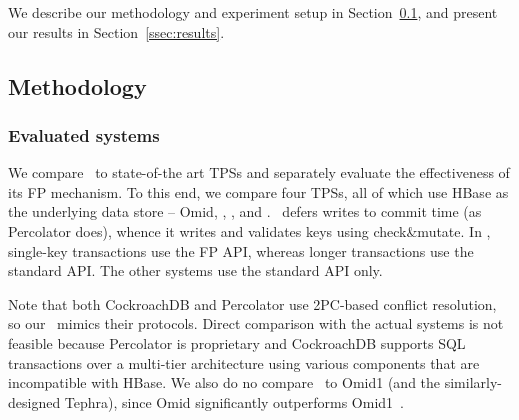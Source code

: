 

We describe our methodology and experiment setup in Section~\ref{ssec:methodology}, and present our results 
in Section~\ref{ssec:results}.

\subsection{Methodology}
\label{ssec:methodology}

\subsubsection{Evaluated systems}

We compare \sys\  to  state-of-the art TPSs and separately evaluate the effectiveness of its FP mechanism.
To this end, we compare four TPSs, all of which use HBase as the underlying data store -- Omid, \sysll, 
\syspc, and \sys. \syspc\ defers writes to commit time (as Percolator does), whence it writes and validates
keys using check\&mutate.
In \sys, single-key transactions use the FP API, whereas longer transactions use the standard API. 
The other systems use the standard API only.

Note that both CockroachDB and Percolator use 2PC-based conflict resolution, so our \syspc\ mimics
their protocols. 
Direct comparison with the actual systems is not feasible because Percolator is proprietary and 
CockroachDB supports SQL transactions over a multi-tier
architecture using various components that are incompatible with HBase. 
We also do no compare \sys\ to Omid1 (and the similarly-designed Tephra), since Omid significantly
outperforms Omid1~\cite{Omid2017}.

